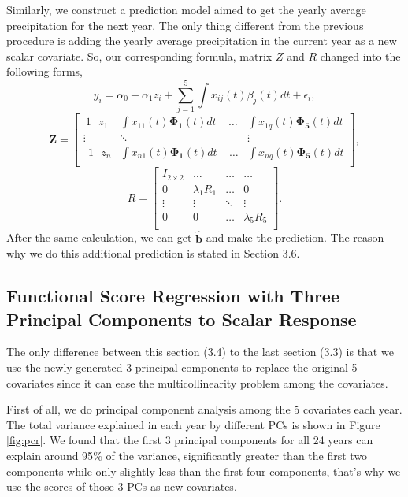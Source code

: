 Similarly, we construct a prediction model aimed to get the yearly average precipitation for the next year. The only thing different from the previous procedure is adding the yearly average precipitation in the current year as a new scalar covariate. So, our corresponding formula, matrix $Z$ and $R$ changed into the following forms,
$$y_i=\alpha_0+{\alpha}_{1}{z}_{i}+ \sum_{j=1}^{5}\int{x_{ij}\left(t\right)\beta_j\left(t\right)dt}+\epsilon_i,$$
$$\mathbf{Z}=\left[\begin{matrix}{\ {1}\ \ \ {z}}_{1}&\int{x_{11}\left(t\right)\mathbf{\Phi}_\mathbf{1}\left(t\right)dt}\ \ \ \ \ \ldots&\int{x_{1q}\left(t\right)\mathbf{\Phi}_\mathbf{5}\left(t\right)dt}\\\vdots&\ddots\ &\vdots\\\ \ {1}\ \ \ {z}_{n}&\int{x_{n1}\left(t\right)\mathbf{\Phi}_\mathbf{1}\left(t\right)dt\ }\ \ \ \ \ldots&\int{x_{nq}\left(t\right)\mathbf{\Phi}_\mathbf{5}\left(t\right)dt}\\\end{matrix}\right],$$
$$
R =\left[\begin{matrix}I_{2\times2}&\ldots&\ldots&\ldots\\0&\lambda_1R_1&\ldots&0\\\vdots&\vdots&\ddots&\vdots\\0&0&\ldots&\lambda_5R_5\\\end{matrix}\right].
$$
After the same calculation, we can get $\hat{\bm b}$ and make the prediction. The reason why we do this additional prediction is stated in Section 3.6.

\subsection{Functional Score Regression with Three Principal Components to Scalar Response}
The only difference between this section (3.4) to the last section (3.3) is that we use the newly generated 3 principal components to replace the original 5 covariates since it can ease the multicollinearity problem among the covariates.

First of all, we do principal component analysis among the 5 covariates each year. The total variance explained in each year by different PCs is shown in Figure \ref{fig:pcr}. We found that the first 3 principal components for all 24 years can explain around 95$\%$ of the variance, significantly greater than the first two components while only slightly less than the first four components, that’s why we use the scores of those 3 PCs as new covariates. 

